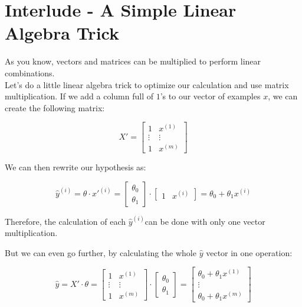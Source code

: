 
\section*{Interlude - A Simple Linear Algebra Trick}

As you know, vectors and matrices can be multiplied to perform linear combinations.\\
Let's do a little linear algebra trick to optimize our calculation and use matrix multiplication.  
If we add a column full of $1$'s to our vector of examples $x$, we can create the following matrix: 

$$
X' = \begin{bmatrix} 1 & x^{(1)} \\ \vdots & \vdots \\ 1 & x^{(m)}\end{bmatrix}
$$
  
We can then rewrite our hypothesis as: 

$$
\hat{y}^{(i)} = \theta \cdot x'^{(i)} = \begin{bmatrix}\theta_0 \\ \theta_1 \end{bmatrix}  \cdot \begin{bmatrix} 1 & x^{(i)} \end{bmatrix} = \theta_0 + \theta_1 x^{(i)}
$$

Therefore, the calculation of each $\hat{y}^{(i)}$can be done with only one vector multiplication. 

But we can even go further, by calculating the whole $\hat{y}$ vector in one operation: 

$$
\hat{y} = X' \cdot \theta = \begin{bmatrix} 1 & x^{(1)} \\ \vdots & \vdots \\ 1 & x^{(m)}\end{bmatrix}\cdot\begin{bmatrix}\theta_0 \\ \theta_1 \end{bmatrix} = \begin{bmatrix} \theta_0 + \theta_1 x^{(1)} \\ \vdots \\ \theta_0 + \theta_1 x^{(m)} \end{bmatrix}
$$

